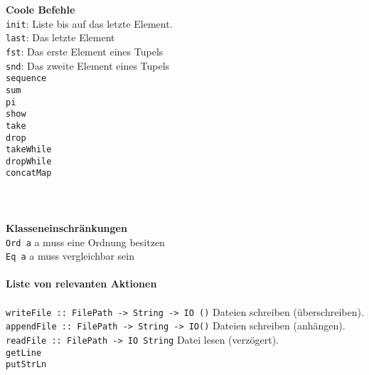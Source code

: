 \documentclass{article}
\begin{document}
\textbf{Coole Befehle}
\\
\texttt{init}: Liste bis auf das letzte Element.\\
\texttt{last}: Das letzte Element\\
\texttt{fst}: Das erste Element eines Tupels\\
\texttt{snd}: Das zweite Element eines Tupels\\
\texttt{sequence}\\
\texttt{sum}\\
\texttt{pi}\\
\texttt{show}\\
\texttt{take}\\
\texttt{drop}\\
\texttt{takeWhile}\\
\texttt{dropWhile}\\
\texttt{concatMap}\\
\texttt{}\\
\texttt{}\\
\\
\textbf{Klasseneinschränkungen}\\
\texttt{Ord a} a muss eine Ordnung besitzen\\
\texttt{Eq a} a muss vergleichbar sein\\
\\
\textbf{Liste von relevanten Aktionen}\\
\\
\texttt{writeFile :: FilePath -> String -> IO ()} Dateien schreiben (überschreiben).\\
\texttt{appendFile :: FilePath -> String -> IO()} Dateien schreiben (anhängen).\\
\texttt{readFile :: FilePath -> IO String} Datei lesen (verzögert).\\
\texttt{getLine}\\
\texttt{putStrLn}\\
\texttt{}\\
\texttt{}\\
\texttt{}\\
\end{document}

